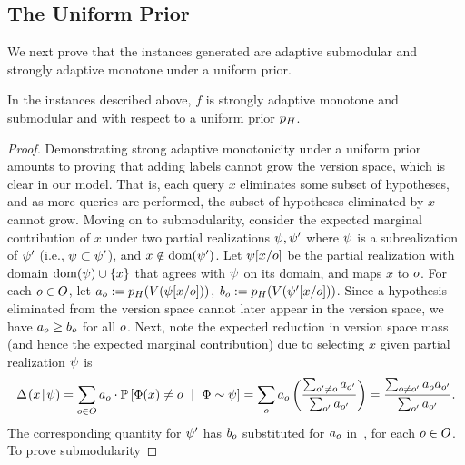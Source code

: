 \subsection{The Uniform Prior}  We next prove that the instances
generated are adaptive submodular and strongly adaptive
monotone under a uniform prior.


\begin{lemma} \label{lem:active-learning-adapt-submod-uniform}
In the instances described above, $f$ is strongly adaptive
monotone and \term submodular and with respect to a uniform prior $p_{H}$.
\end{lemma}

\begin{proof}
Demonstrating strong adaptive monotonicity under a uniform prior 
amounts to proving that adding labels
cannot grow the version space, which is clear in our model. 
That is, each query $x$ eliminates some subset of
hypotheses, and as more queries are performed, the subset of
hypotheses eliminated by $x$ cannot grow.  
%
Moving on to \term submodularity, consider the expected marginal contribution of $x$
under two partial realizations ${\color{black}{\ensuremath{\psi}}}, {\color{black}{\ensuremath{\psi}}}'$ where ${\color{black}{\ensuremath{\psi}}}$ is a
subrealization of ${\color{black}{\ensuremath{\psi}}}'$ (i.e., ${\color{black}{\ensuremath{\psi}}} \subset {\color{black}{\ensuremath{\psi}}}'$), and $x
\notin \operatorname{dom}({\color{black}{\ensuremath{\psi}}}')$.
Let ${{\color{black}{\ensuremath{\psi}}}}\!\left[{x}/{o}\right]$ be the partial
realization with domain $\operatorname{dom}({\color{black}{\ensuremath{\psi}}})  \cup \left\{x\right\}$ that agrees with
${\color{black}{\ensuremath{\psi}}}$ on its domain, and maps $x$ to $o$.
For each $o \in O$, 
let 
$a_{o} :=
p_{H}(V({{\color{black}{\ensuremath{\psi}}}}\!\left[{x}/{o}\right]))$, $b_{o} :=
p_{H}(V({{\color{black}{\ensuremath{\psi}}}'}\!\left[{x}/{o}\right]))$.
Since a hypothesis eliminated from the version space cannot later
appear in the version space, we have 
$a_{o} \ge b_{o}$ for all $o$.
Next, note the expected reduction in version space mass (and hence the expected
marginal contribution) due to selecting $x$ given partial realization
${\color{black}{\ensuremath{\psi}}}$ is 
\begin{equation}
  \label{eq:active01}
  \Delta \hspace{-0.3mm} \left( { {x}\! \mid \! {{\color{black}{\ensuremath{\psi}}}} } \right)   = \sum_{o \in O} a_{o} \cdot 
  \mathbb{P}\left[{\color{black}{\ensuremath{\Phi}}}(x) \neq o \ \mid \ {\color{black}{\ensuremath{\Phi}}} \sim {\color{black}{\ensuremath{\psi}}}\right]  =
  \sum_{o} a_{o}  \left( {\frac{ \sum_{o' \neq
        o} a_{o'} }{  \sum_{o'} a_{o'}  }
  } \right)  = \frac{ \sum_{o \neq o'} a_{o} a_{o'} }{  \sum_{o'} a_{o'}}.
\end{equation}
The corresponding quantity for ${\color{black}{\ensuremath{\psi}}}'$ has $b_{o}$ substituted
for $a_{o}$ in~, for each $o \in O$.
To prove \term submodularity

\end{proof}
